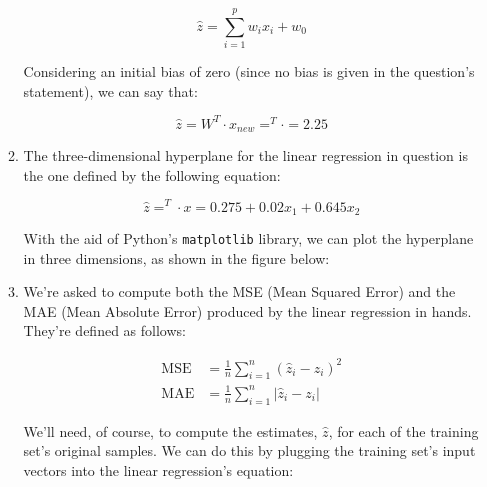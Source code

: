 \documentclass[12pt]{article}
\begin{document}
\begin{enumerate}[leftmargin=\labelsep]
\begin{enumerate}
{                \begin{equation*}
                  \hat{z} = \sum_{i=1}^p w_i x_i + w_0
                \end{equation*}

                Considering an initial bias of zero (since no bias is given in the
                question's statement), we can say that:

                \begin{equation*}
                  \hat{z} = W^T \cdot x_{new}
                  = ^T \cdot 
                  = 2.25
                \end{equation*}
                }
          \item {
                The three-dimensional hyperplane for the linear regression in question
                is the one defined by the following equation:

                \begin{equation*}
                  \hat{z} = ^T \cdot x
                  = 0.275 + 0.02x_1 + 0.645x_2
                \end{equation*}
                }

                With the aid of Python's \texttt{matplotlib} library, we can plot the
                hyperplane in three dimensions, as shown in the figure below:

                \begin{figure}[H]
                  \centering
                  
                \end{figure}
          \item {
                We're asked to compute both the MSE (Mean Squared Error) and the MAE
                (Mean Absolute Error) produced by the linear regression in hands.
                They're defined as follows:

                \begin{align*}
                  \text{MSE} & = \frac{1}{n} \sum_{i=1}^n (\hat{z}_i - z_i)^2 \\
                  \text{MAE} & = \frac{1}{n} \sum_{i=1}^n |\hat{z}_i - z_i|
                \end{align*}

                We'll need, of course, to compute the estimates, $\hat{z}$, for each
                of the training set's original samples. We can do this by plugging the
                training set's input vectors into the linear regression's equation:

}
\end{enumerate}
\end{enumerate}
\end{document}
